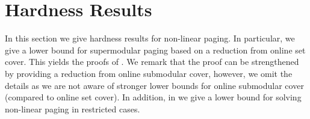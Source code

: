 \documentclass[11pt]{article}
\newcommand{\cC}{{\mathcal{C}}}
\DeclareMathOperator*{\argmin}{arg\,min}
\begin{document}
{%
%


}


\appendix

\section{Hardness Results}
\label{sec:hardness}


In this section we give hardness results for non-linear paging. In particular, we give a lower bound for supermodular paging based on a reduction from online set cover. This yields the proofs of . We remark that the proof can be strengthened by providing a reduction from online submodular cover, however, we omit the details as we are not aware of stronger lower bounds for online submodular cover (compared to online set cover). In addition, in  we give a lower bound for solving non-linear paging in restricted cases. %
\end{document}
